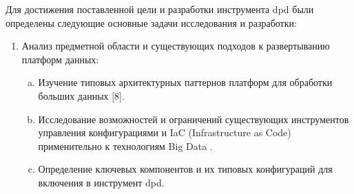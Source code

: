 Для достижения поставленной цели и разработки инструмента dpd были определены следующие основные задачи исследования и разработки:
\begin{enumerate}[1.]
	\item Анализ предметной области и существующих подходов к развертыванию платформ данных:
	      \begin{enumerate}[a.]
		      \item Изучение типовых архитектурных паттернов платформ для обработки больших данных [8].
		      \item Исследование возможностей и ограничений существующих инструментов управления конфигурациями и IaC (Infrastructure as Code) применительно к технологиям Big Data .
		      \item Определение ключевых компонентов и их типовых конфигураций для включения в инструмент dpd.
	      \end{enumerate}


\end{enumerate}
